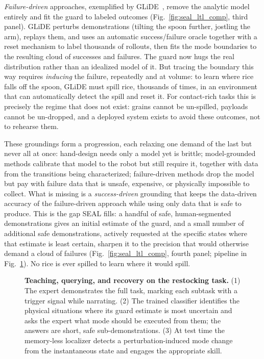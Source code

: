 \emph{Failure-driven} approaches, exemplified by GLiDE~\cite{wang2024grounding}, remove the analytic model entirely and fit the guard to labeled outcomes (Fig.~\ref{fig:seal_ltl_comp}, third panel). GLiDE perturbs demonstrations (tilting the spoon further, jostling the arm), replays them, and uses an automatic success/failure oracle together with a reset mechanism to label thousands of rollouts, then fits the mode boundaries to the resulting cloud of successes and failures. The guard now hugs the real distribution rather than an idealized model of it. But tracing the boundary this way requires \emph{inducing} the failure, repeatedly and at volume: to learn where rice falls off the spoon, GLiDE must spill rice, thousands of times, in an environment that can automatically detect the spill and reset it. For contact-rich tasks this is precisely the regime that does not exist: grains cannot be un-spilled, payloads cannot be un-dropped, and a deployed system exists to avoid these outcomes, not to rehearse them.

These groundings form a progression, each relaxing one demand of the last but never all at once: hand-design needs only a model yet is brittle; model-grounded methods calibrate that model to the robot but still require it, together with data from the transitions being characterized; failure-driven methods drop the model but pay with failure data that is unsafe, expensive, or physically impossible to collect. What is missing is a \emph{success-driven} grounding that keeps the data-driven accuracy of the failure-driven approach while using only data that is safe to produce. This is the gap SEAL fills: a handful of safe, human-segmented demonstrations gives an initial estimate of the guard, and a small number of additional safe demonstrations, actively requested at the specific states where that estimate is least certain, sharpen it to the precision that would otherwise demand a cloud of failures (Fig.~\ref{fig:seal_ltl_comp}, fourth panel; pipeline in Fig.~\ref{fig:intro}). No rice is ever spilled to learn where it would spill.

\begin{figure}[t!]
\centering

\vspace{-3mm}
\caption{\textbf{Teaching, querying, and recovery on the restocking task.} (1) The expert demonstrates the full task, marking each subtask with a trigger signal while narrating. (2) The trained classifier identifies the physical situations where its guard estimate is most uncertain and asks the expert what mode should be executed from them; the answers are short, safe sub-demonstrations. (3) At test time the memory-less localizer detects a perturbation-induced mode change from the instantaneous state and engages the appropriate skill.}
\label{fig:intro}
\end{figure}

